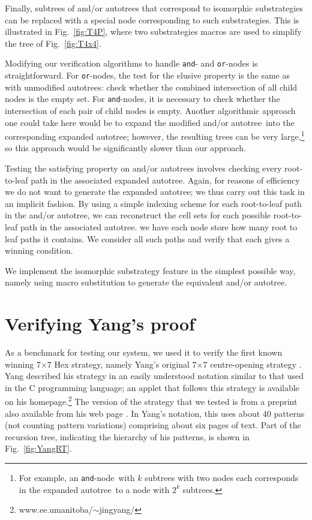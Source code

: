 \documentclass{llncs}
\def\at{autotree}
\def\aoat{and/or autotree}
\def\myAND{\mbox{\tt and}}
\def\myOR{\mbox{\tt or}}
\def\andnode{\myAND-node}
\def\ornode{\myOR-node}
\newcommand{\board}[2]{\mbox{$#1$$\times$$#2$}}
\begin{document}


Finally, subtrees of \aoat s
that correspond to isomorphic substrategies
can be replaced with a special node
corresponding to such substrategies.
This is illustrated in Fig.~\ref{fig:T4P},
where two substrategies macros are used
to simplify the tree of 
Fig.~\ref{fig:T4x4}.

Modifying our verification algorithms to
handle \myAND- and \ornode s is straightforward.
For \myOR-nodes, the test for the elusive property
is the same as with unmodified \at s:
check whether the combined intersection 
of all child nodes is the empty set.
For \andnode s, it is necessary to check 
whether the intersection of each
pair of child nodes is empty.
Another algorithmic approach one could take
here would be to expand the modified \aoat\
into the corresponding expanded \at;
however, the resulting trees can be very large,\footnote{For example,
  an \andnode\ with $k$ subtrees with two nodes each
  corresponds in the expanded \at\ to a node
  with $2^k$ subtrees.}
so this approach would be significantly slower than our approach.

Testing the satisfying property on \aoat s
involves checking every root-to-leaf path
in the associated expanded \at.
Again, for reasons of efficiency we do not want
to generate the expanded \at;
we thus carry out this task in an implicit fashion.
By using a simple indexing scheme for each root-to-leaf path
in the \aoat, we can reconstruct the cell sets
for each possible root-to-leaf path in the associated \at.
we have each node store how many root to leaf paths it contains.
We consider all such paths and verify that each
gives a winning condition.

We implement the isomorphic substrategy feature
in the simplest possible way, namely
using macro substitution to generate
the equivalent \aoat.



\section{Verifying Yang's proof}
As a benchmark for testing our system,
we used it to verify the first known winning \board{7}{7} Hex strategy,
namely Yang's original \board{7}{7} 
centre-opening strategy \cite{Yang01web,Yang01}.
Yang described his strategy in an easily understood notation
similar to that used in the C programming language;
an applet that follows this strategy is available on his homepage.\footnote{www.ee.umanitoba/$\sim$jingyang/}
The version of the strategy that we tested
is from a preprint also available from his web page \cite{Yang01web}.
In Yang's notation, this uses about 40 patterns 
(not counting pattern variations) comprising about six pages of text.
Part of the recursion tree, 
indicating the hierarchy of his patterns,
is shown in Fig.~\ref{fig:YangRT}.
\end{document}
